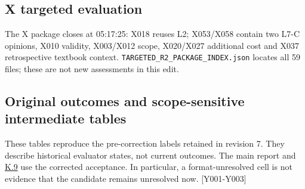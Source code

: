 \subsection[X targeted evaluation]{\texorpdfstring{\protect\hypertarget{k7}{}X targeted evaluation}{X targeted evaluation}}
The X package closes at 05:17:25: X018 reuses L2; X053/X058 contain two L7-C opinions, X010 validity, X003/X012 scope, X020/X027 additional cost and X037 retrospective textbook context. \nolinkurl{TARGETED_R2_PACKAGE_INDEX.json} locates all 59 files; these are not new assessments in this edit.

\subsection[Original outcomes and scope-sensitive intermediate tables]{\texorpdfstring{\protect\hypertarget{k8}{}Original outcomes and scope-sensitive intermediate tables}{Original outcomes and scope-sensitive intermediate tables}}
These tables reproduce the pre-correction labels retained in revision 7. They describe historical evaluator states, not current outcomes. The main report and \hyperlink{k9}{K.9} use the corrected acceptance. In particular, a format-unresolved cell is not evidence that the candidate remains unresolved now. [Y001-Y003]


